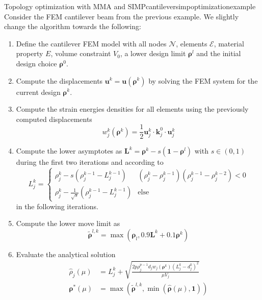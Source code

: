 \begin{example}{Topology optimization with MMA and SIMP}{cantileversimpoptimizationexample}
    Consider the FEM cantilever beam from the previous example. We slightly change the algorithm towards the following:  
    \begin{enumerate}
        \item Define the cantilever FEM model with all nodes $\mathcal{N}$, elements $\mathcal{E}$, material property $E$, volume constraint $V_0$, a lower design limit $\pmb{\rho}^l$ and the initial design choice $\pmb{\rho}^0$.
        \item Compute the displacements $\mathbf{u}^k = \mathbf{u}(\pmb{\rho}^k)$ by solving the FEM system for the current design $\pmb{\rho}^k$.
        \item Compute the strain energies densities for all elements using the previously computed displacements   
        \begin{equation}
            w^k_j(\pmb{\rho}^k) = \frac{1}{2}\mathbf{u}^k_j \cdot \mathbf{k}^0_j \cdot \mathbf{u}^k_j
        \end{equation}
        \item Compute the lower asymptotes as $\mathbf{L}^k =\pmb{\rho}^k - s (\mathbf{1} - \pmb{\rho}^l)$ with $s \in (0,1)$ during the first two iterations and according to 
        \begin{equation}
            L^k_j = 
            \begin{cases}
                \rho^k_j - s  (\rho^{k-1}_j-L^{k-1}_j) & (\rho_j^k-\rho_j^{k-1})(\rho_j^{k-1}-\rho_j^{k-2}) < 0\\
                \rho^k_j - \frac{1}{\sqrt{s}}  (\rho^{k-1}_j-L^{k-1}_j) & \text{else}
            \end{cases}
        \end{equation}
        in the following iterations.
        \item Compute the lower move limit as 
        \begin{equation}
            \tilde{\pmb{\rho}}^{l,k} = \max(\pmb{\rho}_l,  0.9 \mathbf{L}^k + 0.1 \pmb{\rho}^k)
        \end{equation}
        \item Evaluate the analytical solution
            \begin{align}
                \hat{\rho}_j(\mu) &= L_j^k + \sqrt{\frac{2 p \rho_j^{p-1} d_j w_j (\pmb{\rho}^k)
                (L^k_j-d^k_j)^2}{\mu V_j}} \\
                \pmb{\rho}^* (\mu) &= \max\left(\tilde{\pmb{\rho}}^{l,k}, \min \left(\hat{\pmb{\rho}}(\mu), \mathbf{1} \right)\right)

\end{align}
\end{enumerate}
\end{example}
